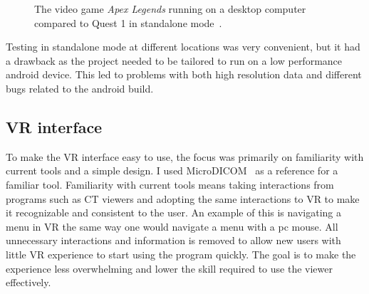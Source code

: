 \documentclass[a4paper]{report}
\begin{document}
\begin{figure}[h!]
    \centering

	\hfill
	\caption{The video game \emph{Apex Legends} running on a desktop computer compared to Quest 1 in standalone mode~\cite{tyriel_wood_-_vr_tech_oculus_2019}.}\label{comp}
  \small

\end{figure}
Testing in standalone mode at different locations was very convenient, but it had a drawback as the project needed to be tailored to run on a low performance android device. This led to problems with both high resolution data and different bugs related to the android build.

\subsection{VR interface}


To make the VR interface easy to use, the focus was primarily on familiarity with current tools and a simple design.
I used MicroDICOM~\cite{noauthor_dicom_nodate-1} as a reference for a familiar tool.
Familiarity with current tools means taking interactions from programs such as CT viewers and adopting the same interactions to VR to make it recognizable and consistent to the user. An example of this is navigating a menu in VR the same way one would navigate a menu with a pc mouse.
 All unnecessary interactions and information is removed to allow new users with little VR experience to start using the program quickly. The goal is to make the experience less overwhelming and lower the skill required to use the viewer effectively.
\end{document}
